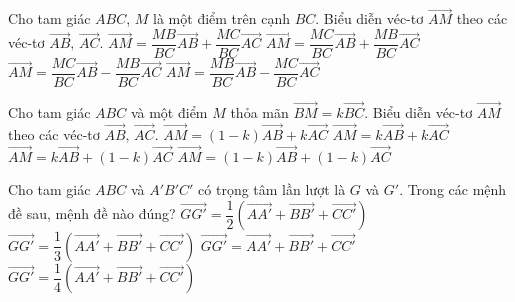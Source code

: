 \begin{ex}%
	Cho tam giác $ABC$, $M$ là một điểm trên cạnh $BC$. Biểu diễn véc-tơ $\vec{AM}$ theo các véc-tơ $\vec{AB},\,\vec{AC}$.
	\choice
	{$\vec{AM}=\dfrac{MB}{BC}\vec{AB}+\dfrac{MC}{BC}\vec{AC}$}
	{\True $\vec{AM}=\dfrac{MC}{BC}\vec{AB}+\dfrac{MB}{BC}\vec{AC}$}
	{$\vec{AM}=\dfrac{MC}{BC}\vec{AB}-\dfrac{MB}{BC}\vec{AC}$}
	{$\vec{AM}=\dfrac{MB}{BC}\vec{AB}-\dfrac{MC}{BC}\vec{AC}$}
\end{ex}

\begin{ex}%
	Cho tam giác $ABC$ và một điểm $M$ thỏa mãn $\vec{BM}=k\vec{BC}$. Biểu diễn véc-tơ $\vec{AM}$ theo các véc-tơ $\vec{AB},\,\vec{AC}$.
	\choice
	{\True $\vec{AM}=(1-k)\vec{AB}+k\vec{AC}$}
	{$\vec{AM}=k\vec{AB}+k\vec{AC}$}
	{$\vec{AM}=k\vec{AB}+(1-k)\vec{AC}$}
	{$\vec{AM}=(1-k)\vec{AB}+(1-k)\vec{AC}$}
\end{ex}


\begin{ex}%
	Cho tam giác $ABC$ và $A'B'C'$ có trọng tâm lần lượt là $G$ và $G'$. Trong các mệnh đề sau, mệnh đề nào đúng?
	\choice
	{$\vec{GG'}=\dfrac{1}{2}\left(\vec{AA'}+\vec{BB'}+\vec{CC'}\right)$}
	{\True $\vec{GG'}=\dfrac{1}{3}\left(\vec{AA'}+\vec{BB'}+\vec{CC'}\right)$}
	{$\vec{GG'}=\vec{AA'}+\vec{BB'}+\vec{CC'}$}
	{$\vec{GG'}=\dfrac{1}{4}\left(\vec{AA'}+\vec{BB'}+\vec{CC'}\right)$}
\end{ex}



